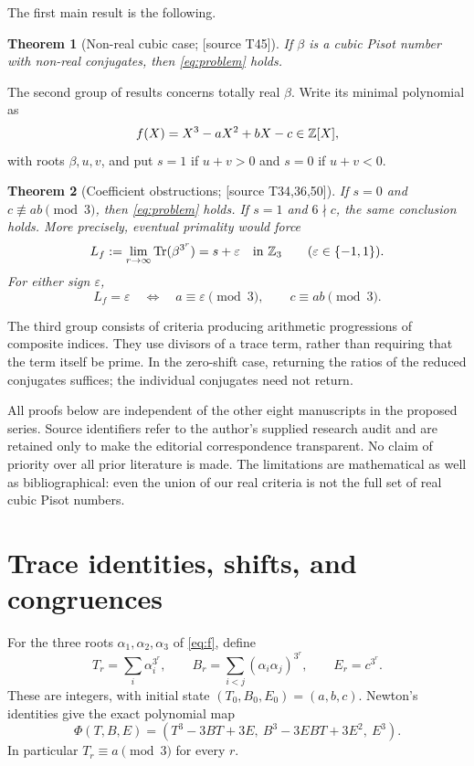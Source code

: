 \documentclass[11pt,a4paper]{article}
\newtheorem{theorem}{Theorem}[section]
\theoremstyle{definition}\newtheorem{definition}[theorem]{Definition}
\theoremstyle{remark}\newtheorem{remark}[theorem]{Remark}
\DeclareMathOperator{\Tr}{Tr}\DeclareMathOperator{\Norm}{N}\DeclareMathOperator{\trdeg}{trdeg}\DeclareMathOperator{\ord}{ord}\DeclareMathOperator{\lcm}{lcm}
\newcommand{\sourceT}[1]{\textup{[source T#1]}}
\begin{document}
The first main result is the following.
\begin{theorem}[Non-real cubic case; \sourceT{45}]\label{thm:complex}
If $\beta$ is a cubic Pisot number with non-real conjugates, then \eqref{eq:problem} holds.
\end{theorem}
The second group of results concerns totally real $\beta$. Write its minimal polynomial as
\begin{equation}\label{eq:f}
 f(X)=X^3-aX^2+bX-c\in\mathbb Z[X],
\end{equation}
with roots $\beta,u,v$, and put $s=1$ if $u+v>0$ and $s=0$ if $u+v<0$.
\begin{theorem}[Coefficient obstructions; \sourceT{34,36,50}]\label{thm:intro-real}
If $s=0$ and $c\not\equiv ab\pmod3$, then \eqref{eq:problem} holds. If $s=1$ and $6\nmid c$, the same conclusion holds. More precisely, eventual primality would force
\[
 L_f:=\lim_{r\to\infty}\Tr(\beta^{3^r})=s+\varepsilon\quad\text{in }\Z_3
 \qquad(\varepsilon\in\{-1,1\}).
\]
For either sign $\varepsilon$,
\[
 L_f=\varepsilon\quad\Longleftrightarrow\quad
 a\equiv\varepsilon\pmod3,\qquad c\equiv ab\pmod3.
\]
\end{theorem}
The third group consists of criteria producing arithmetic progressions of composite indices. They use divisors of a trace term, rather than requiring that the term itself be prime. In the zero-shift case, returning the ratios of the reduced conjugates suffices; the individual conjugates need not return.

All proofs below are independent of the other eight manuscripts in the proposed series. Source identifiers refer to the author's supplied research audit and are retained only to make the editorial correspondence transparent. No claim of priority over all prior literature is made. The limitations are mathematical as well as bibliographical: even the union of our real criteria is not the full set of real cubic Pisot numbers.

\section{Trace identities, shifts, and congruences}
For the three roots $\alpha_1,\alpha_2,\alpha_3$ of \eqref{eq:f}, define
\[
 T_r=\sum_i\alpha_i^{3^r},\qquad
 B_r=\sum_{i<j}(\alpha_i\alpha_j)^{3^r},\qquad E_r=c^{3^r}.
\]
These are integers, with initial state $(T_0,B_0,E_0)=(a,b,c)$. Newton's identities give the exact polynomial map
\begin{equation}\label{eq:Phi}
 \Phi(T,B,E)=(T^3-3BT+3E,\ B^3-3EBT+3E^2,\ E^3).
\end{equation}
In particular $T_r\equiv a\pmod3$ for every $r$.
\end{document}
